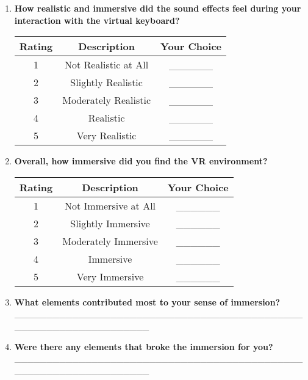 \documentclass[12pt]{article}
\begin{document}
\begin{enumerate}
    \item \textbf{How realistic and immersive did the sound effects feel during your interaction with the virtual keyboard?}
    \begin{table}[h!]
        \centering
        \begin{tabular}{|c|c|c|}
            \hline
            \textbf{Rating} & \textbf{Description} & \textbf{Your Choice} \\
            \hline
            1 & Not Realistic at All & \_\_\_\_\_\_ \\
            \hline
            2 & Slightly Realistic & \_\_\_\_\_\_ \\
            \hline
            3 & Moderately Realistic & \_\_\_\_\_\_ \\
            \hline
            4 & Realistic & \_\_\_\_\_\_ \\
            \hline
            5 & Very Realistic & \_\_\_\_\_\_ \\
            \hline
        \end{tabular}
    \end{table}

    \item \textbf{Overall, how immersive did you find the VR environment?}
    \begin{table}[h!]
        \centering
        \begin{tabular}{|c|c|c|}
            \hline
            \textbf{Rating} & \textbf{Description} & \textbf{Your Choice} \\
            \hline
            1 & Not Immersive at All & \_\_\_\_\_\_ \\
            \hline
            2 & Slightly Immersive & \_\_\_\_\_\_ \\
            \hline
            3 & Moderately Immersive & \_\_\_\_\_\_ \\
            \hline
            4 & Immersive & \_\_\_\_\_\_ \\
            \hline
            5 & Very Immersive & \_\_\_\_\_\_ \\
            \hline
        \end{tabular}
    \end{table}
    
    \item \textbf{What elements contributed most to your sense of immersion?} \\
    \_\_\_\_\_\_\_\_\_\_\_\_\_\_\_\_\_\_\_\_\_\_\_\_\_\_\_\_\_\_\_\_\_\_\_\_\_\_\_\_\_\_\_\_\_\_\_\_\_\_\_\_\_\_\_\_\_\_\_\_\_\_\_\_\_\_
    \item \textbf{Were there any elements that broke the immersion for you?} \\
    \_\_\_\_\_\_\_\_\_\_\_\_\_\_\_\_\_\_\_\_\_\_\_\_\_\_\_\_\_\_\_\_\_\_\_\_\_\_\_\_\_\_\_\_\_\_\_\_\_\_\_\_\_\_\_\_\_\_\_\_\_\_\_\_\_\_
\end{enumerate} 
\end{document}
